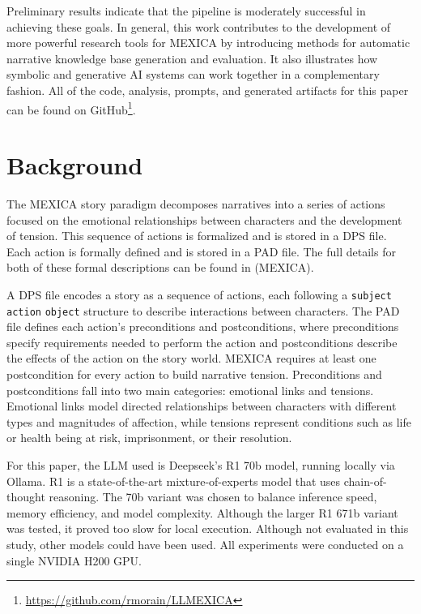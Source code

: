 \documentclass[phd,electronic,oneside,twosidetoc,letterpaper,chaptercenter,parttop,lof]{byumsphd}
\begin{document}
Preliminary results indicate that the pipeline is moderately successful in achieving these goals. In general, this work contributes to the development of more powerful research tools for MEXICA by introducing methods for automatic narrative knowledge base generation and evaluation. It also illustrates how symbolic and generative AI systems can work together in a complementary fashion.  All of the code, analysis, prompts, and generated artifacts for this paper can be found on GitHub\footnote{\url{https://github.com/rmorain/LLMEXICA}}.



\section{Background}

The MEXICA story paradigm decomposes narratives into a series of actions focused on the emotional relationships between characters and the development of tension. This sequence of actions is formalized and is stored in a DPS file. Each action is formally defined and is stored in a PAD file. The full details for both of these formal descriptions can be found in (MEXICA). 

A DPS file encodes a story as a sequence of actions, each following a \texttt{subject} \texttt{action} \texttt{object} structure to describe interactions between characters. The PAD file defines each action's preconditions and postconditions, where preconditions specify requirements needed to perform the action and postconditions describe the effects of the action on the story world. MEXICA requires at least one postcondition for every action to build narrative tension. Preconditions and postconditions fall into two main categories: emotional links and tensions. Emotional links model directed relationships between characters with different types and magnitudes of affection, while tensions represent conditions such as life or health being at risk, imprisonment, or their resolution.

For this paper, the LLM used is Deepseek's R1 70b model, running locally via Ollama. R1 is a state-of-the-art mixture-of-experts model that uses chain-of-thought reasoning. The 70b variant was chosen to balance inference speed, memory efficiency, and model complexity. Although the larger R1 671b variant was tested, it proved too slow for local execution. Although not evaluated in this study, other models could have been used. All experiments were conducted on a single NVIDIA H200 GPU.
\end{document}
